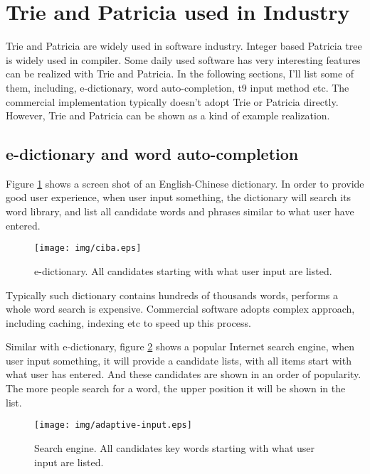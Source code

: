 \documentclass{article}
\begin{document}
\section{Trie and Patricia used in Industry}
Trie and Patricia are widely used in software industry. Integer based
Patricia tree is widely used in compiler. Some daily
used software has very interesting features can be realized with
Trie and Patricia. In the following sections, I'll list some of them,
including, e-dictionary, word auto-completion, t9 input method etc.
The commercial implementation typically doesn't adopt Trie or Patricia
directly. However, Trie and Patricia can be shown as a kind of
example realization.

\subsection{e-dictionary and word auto-completion}
Figure \ref{fig:e-dict} shows a screen shot of an English-Chinese dictionary.
In order to provide good user experience, when user input something,
the dictionary will search its word library, and list all candidate words and
phrases similar to what user have entered.

\begin{figure}[htbp]
       \begin{center}
	\texttt{[image: img/ciba.eps]}
        \caption{e-dictionary. All candidates starting with what user input are listed.}
        \label{fig:e-dict}
       \end{center}
\end{figure}

Typically such dictionary contains hundreds of thousands words, performs a whole
word search is expensive. Commercial software adopts complex approach, including
caching, indexing etc to speed up this process.

Similar with e-dictionary, figure \ref{fig:word-completion} shows a popular
Internet search engine, when user input something, it will provide a candidate
lists, with all items start with what user has entered. And these candidates
are shown in an order of popularity. The more people search for a word, the
upper position it will be shown in the list.

\begin{figure}[htbp]
       \begin{center}
	\texttt{[image: img/adaptive-input.eps]}
        \caption{Search engine. All candidates key words starting with what user input are listed.}
        \label{fig:word-completion}
       \end{center}
\end{figure}
\end{document}
